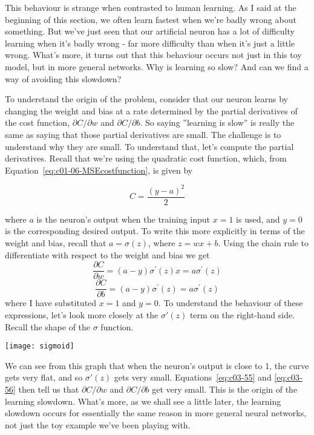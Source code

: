 This behaviour is strange when contrasted to human learning. As I said at the beginning of this section, we often learn fastest when we're badly wrong about something. But we've just seen that our artificial neuron has a lot of difficulty learning when it's badly wrong - far more difficulty than when it's just a little wrong. What's more, it turns out that this behaviour occurs not just in this toy model, but in more general networks. Why is learning so slow? And can we find a way of avoiding this slowdown?

To understand the origin of the problem, consider that our neuron learns by changing the weight and bias at a rate determined by the partial derivatives of the cost function, $\partial C / \partial w$
and $\partial C / \partial b$. So saying ''learning is slow'' is really the same as saying that those partial derivatives are small. The challenge is to understand why they are small. To understand that, let's compute the partial derivatives. Recall that we're using the quadratic cost function, which, from Equation~\ref{eq:c01-06-MSEcostfunction}, is given by 

\begin{equation}
C=\frac{(y-a)^{2}}{2}
\label{eq:c03-54}
\end{equation}

where $a$ is the neuron's output when the training input $x=1$ is used, and $y=0$ is the corresponding desired output. To write this more explicitly in terms of the weight and bias, recall that $a=\sigma(z)$, where $z=wx+b$. Using the chain rule to differentiate with respect to the weight and bias we get 
\begin{equation}
\frac{\partial C}{\partial w}=(a-y) \sigma^{\prime}(z) x=a \sigma^{\prime}(z)
\label{eq:c03-55}
\end{equation}
\begin{equation}
\frac{\partial C}{\partial b}=(a-y) \sigma^{\prime}(z)=a \sigma^{\prime}(z)
\label{eq:c03-56}
\end{equation}
where I have substituted $x=1$ and $y=0$. To understand the behaviour of these expressions, let's look more closely at the $\sigma\prime(z)$ term on the right-hand side. Recall the shape of the $\sigma$
function.
\begin{marginfigure}
\texttt{[image: sigmoid]}
\end{marginfigure}

We can see from this graph that when the neuron's output is close to 1, the curve gets very flat, and so $\sigma\prime(z)$ gets very small. Equations~\ref{eq:c03-55} and  \ref{eq:c03-56} then tell us that  $\partial C / \partial w$
and $\partial C / \partial b$
get very small. This is the origin of the learning slowdown. What's more, as we shall see a little later, the learning slowdown occurs for essentially the same reason in more general neural networks, not just the toy example we've been playing with.

